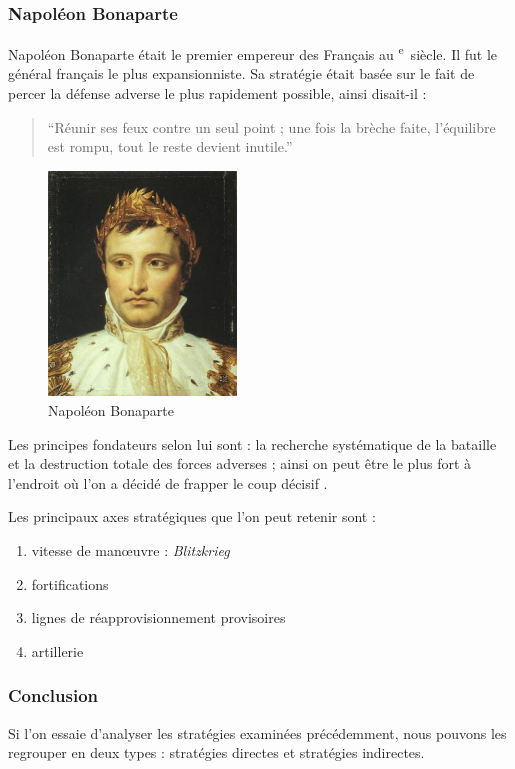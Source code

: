\documentclass{article}
\newcommand{\cRM}[1]{\MakeUppercase{\romannumeral #1}}  %
\newcommand{\siecle}[1]{\cRM{#1}\textsuperscript{e}~siècle}
\begin{document}
\subsubsection{Napoléon Bonaparte}
Napoléon Bonaparte était le premier empereur des Français au \siecle{18}. Il fut le général français le plus expansionniste. Sa stratégie était basée sur le fait de percer la défense adverse le plus rapidement possible, ainsi disait-il : \begin{quote}“Réunir ses feux contre un seul point ; une fois la brèche faite, l’équilibre est rompu, tout le reste devient inutile.”\end{quote}
\begin{figure}[H]
	\begin{centering}
	\includegraphics[width=5cm]{../ressources/napoleon}
	\caption{Napoléon Bonaparte \cite{napoleon_portrait}}
	\end{centering}
\end{figure}

Les principes fondateurs selon lui sont : la recherche systématique de la bataille et la destruction totale des forces adverses ; ainsi on peut être le plus fort à l’endroit où l’on a décidé de frapper le coup décisif \cite{napoleon_wiki}.

Les principaux axes stratégiques \cite{napoleon} que l'on peut retenir sont :
\begin{enumerate}
\item vitesse de manœuvre : \emph{Blitzkrieg}
\item fortifications
\item lignes de réapprovisionnement provisoires
\item artillerie
\end{enumerate}


\subsubsection{Conclusion}
Si l'on essaie d'analyser les stratégies examinées précédemment, nous pouvons les regrouper en deux types : stratégies directes et stratégies indirectes.
\end{document}
